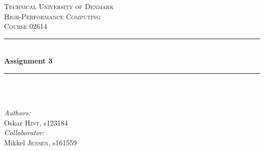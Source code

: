 \begin{titlepage}

\newcommand{\HRule}{\rule{\linewidth}{0.5mm}} %

\center %
 

\textsc{\LARGE Technical University of Denmark}\\[1.5cm] %
\textsc{\Large High-Performance Computing}\\[0.5cm] %
\textsc{\large Course 02614}\\[0.5cm] %


\HRule \\[0.4cm]
{ \huge \bfseries Assignment 3}\\[0.4cm] %
\HRule \\[1.5cm]
 

~

\Large \emph{Authors:}\\
Oskar \textsc{Hint}, s123184\\[10pt]
\Large \emph{Collaborator:}\\
Mikkel \textsc{Jensen}, s161559\\[2cm] %


\end{titlepage}
